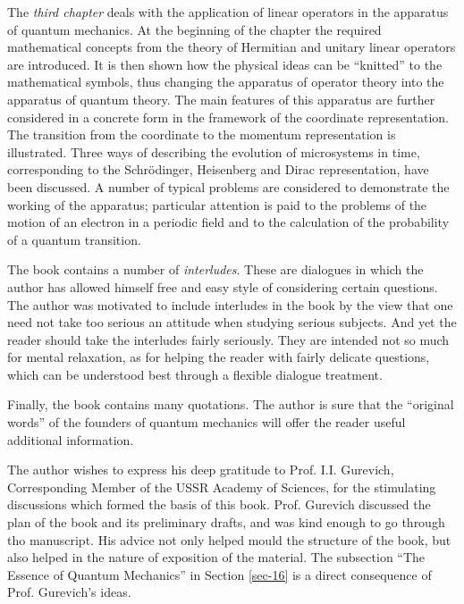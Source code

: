 \documentclass[a4paper,sfsidenotes,colorlinks=true]{tufte-book}
\numberwithin{equation}{section}
\numberwithin{figure}{section}
\begin{document}
The \emph{third chapter} deals with the application of linear operators in the apparatus of quantum mechanics. At the beginning of the chapter the required mathematical concepts from the theory of Hermitian and unitary linear operators are introduced. It is then shown how the physical ideas can be ``knitted'' to the mathematical symbols, thus changing the apparatus of operator theory into the apparatus of quantum theory. The main features of this apparatus are further considered in a concrete form in the framework of the coordinate representation. The transition from the coordinate to the momentum representation is illustrated. Three ways of describing the evolution of microsystems in time, corresponding to the Schr\"odinger, Heisenberg and Dirac representation, have been discussed. A number of typical problems are considered to demonstrate the working of the apparatus; particular attention is paid to the problems of the motion of an electron in a periodic field and to the calculation of the probability of a quantum transition.

The book contains a number of \emph{interludes}. These are dialogues in which the author has allowed himself free and easy style of considering certain questions. The author was motivated to include interludes in the book by the view that one need not take too serious an attitude when studying serious subjects. And yet the reader should take the interludes fairly seriously. They are intended not so much for mental relaxation, as for helping the reader with fairly delicate questions, which can be understood best through a flexible dialogue treatment. 

Finally, the book contains many quotations. The author is sure that the ``original words'' of the founders of quantum mechanics will offer the reader useful additional information.

The author wishes to express his deep gratitude to Prof. I.I. Gurevich, Corresponding Member of the USSR Academy of Sciences, for the stimulating discussions which formed the basis of this book. Prof. Gurevich discussed the plan of the book and its preliminary drafts, and was kind enough to go through tho manuscript. His advice not only helped mould the structure of the book, but also helped in the nature of exposition of the material. The subsection ``The Essence of Quantum Mechanics'' in Section \ref{sec-16} is a direct consequence of Prof. Gurevich's ideas. 
\end{document}
